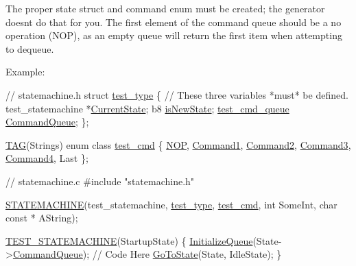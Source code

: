 The proper state struct and command enum must be created; the generator doesn\textquotesingle{}t do that for you. The first element of the command queue should be a no operation ({\ttfamily N\+OP}), as an empty queue will return the first item when attempting to dequeue.

Example\+: 
\begin{DoxyCode}
\textcolor{comment}{// statemachine.h}
\textcolor{keyword}{struct }\hyperlink{structtest__type}{test\_type}
\{
    \textcolor{comment}{// These three variables *must* be defined.}
    test\_statemachine *\hyperlink{structtest__type_a48139457e16e23a57531e5af02be7f14}{CurrentState};
    b8 \hyperlink{structtest__type_a36eb3041ef1341aec27a2a2d98500ce6}{isNewState};
    \hyperlink{structtest__cmd__queue}{test\_cmd\_queue} \hyperlink{structtest__type_a9ef32b05c6f8a712062f8261d71665ca}{CommandQueue};
\};

\hyperlink{PreprocTest_8h_a2606cd56d2d8f567785bde5848176722}{TAG}(Strings)
\textcolor{keyword}{enum class} \hyperlink{PreprocTest_8h_a55ed691059222a58555cf9992ec14431}{test\_cmd}
\{
    \hyperlink{PreprocTest_8h_a55ed691059222a58555cf9992ec14431a1a004f5abe2b334db21328be1ea6b593}{NOP},
    \hyperlink{PreprocTest_8h_a55ed691059222a58555cf9992ec14431a1ed25d14e3a228b0089b334bdbca5769}{Command1},
    \hyperlink{PreprocTest_8h_a55ed691059222a58555cf9992ec14431a0c33f49f722805e5a6f6f759b491fa2a}{Command2},
    \hyperlink{PreprocTest_8h_a55ed691059222a58555cf9992ec14431a732a6c81e81f68d48d63e795bd06ab22}{Command3},
    \hyperlink{PreprocTest_8h_a55ed691059222a58555cf9992ec14431aeb4001380fa7b2b0c963a882c2305280}{Command4},
    Last
\};

\textcolor{comment}{// statemachine.c}
\textcolor{preprocessor}{#include "statemachine.h"}

\hyperlink{PreprocTest_8cpp_a47061d27749d7e9de66e4e834ab28848}{STATEMACHINE}(test\_statemachine, \hyperlink{structtest__type}{test\_type}, \hyperlink{PreprocTest_8h_a55ed691059222a58555cf9992ec14431}{test\_cmd}, \textcolor{keywordtype}{int} SomeInt, \textcolor{keywordtype}{char} \textcolor{keyword}{const} *
      AString);

\hyperlink{Generated__Test_8h_a60e76ed427c4968689b9571af7254547}{TEST\_STATEMACHINE}(StartupState)
\{
    \hyperlink{Generated__Test_8h_a43822849924e4365ec1ad146736a7967}{InitializeQueue}(State->\hyperlink{structtest__type_a9ef32b05c6f8a712062f8261d71665ca}{CommandQueue});
    \textcolor{comment}{// Code Here}
    \hyperlink{Generated__Test_8h_ad4b73e92f4af2b501841ce35b274f71c}{GoToState}(State, IdleState);
\}


\end{DoxyCode}
